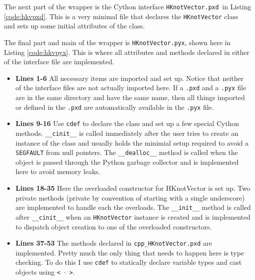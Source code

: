 
    
    \mainstretch{}

    \noindent The next part of the wrapper is the Cython interface \texttt{HKnotVector.pxd }in Listing \ref{code:hkvpxd}. This is a very minimal file that declares the \texttt{HKnotVector} class and sets up some initial attributes of the class.

    
    \mainstretch{}

    The final part and main of the wrapper is \texttt{HKnotVector.pyx}, shown here in Listing \ref{code:hkvpyx}. This is where all attributes and methods declared in either of the interface file are implemented.

    

    \begin{itemize}
      \item \textbf{Lines 1-6} All necessary items are imported and set up. Notice that neither of the interface files are not actually imported here. If a \texttt{.pxd} and a \texttt{.pyx} file are in the same directory and have the same name, then all things imported or defined in the \texttt{.pxd} are automatically available in the \texttt{.pyx} file.
      \item \textbf{Lines 9-16} Use \texttt{cdef} to declare the class and set up a few special Cython methods. \texttt{\_\_cinit\_\_} is called immediately after the user tries to create an instance of the class and usually holds the minimial setup required to avoid  a \texttt{SEGFAULT} from null pointers. The \texttt{\_\_dealloc\_\_} method is called when the object is passed through the Python garbage collector and is implemented here to avoid memory leaks.
      \item \textbf{Lines 18-35} Here the overloaded constructor for HKnotVector is set up. Two private methods (private by convention of starting with a single underscore) are implemented to handle each the overloads. The \texttt{\_\_init\_\_} method is called after \texttt{\_\_cinit\_\_} when an \texttt{HKnotVector} instance is created and is implemented to dispatch object creation to one of the overloaded constructors.
      \item \textbf{Lines 37-53} The methods declared in \texttt{cpp\_HKnotVector.pxd} are implemented. Pretty much the only thing that needs to happen here is type checking. To do this I use \texttt{cdef} to statically declare variable types and cast objects using \texttt{< $\cdot$ >}.
    \end{itemize}
    \mainstretch{}

